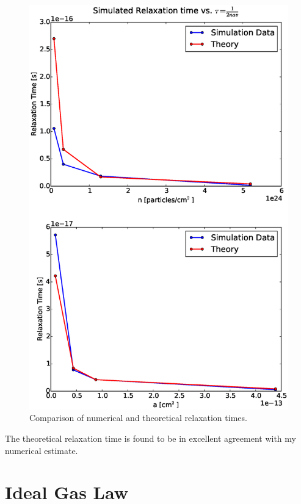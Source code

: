 \documentclass[12pt]{amsart}
\begin{document}
\begin{figure}[h!]
  \centering
    \includegraphics[width=1.0\textwidth]{tau.eps}
    \caption{Comparison of numerical and theoretical relaxation times.}
\end{figure}

The theoretical relaxation time is found to be in excellent agreement with my numerical estimate.


\section{Ideal Gas Law}
\end{document}
